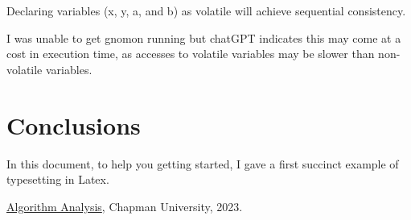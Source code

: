 \documentclass{article}
\theoremstyle{theorem}
\theoremstyle{definition}
\theoremstyle{remark}
\begin{document}
\begin{itemize}
    Declaring variables (x, y, a, and b) as volatile will achieve sequential consistency. 

    I was unable to get gnomon running but chatGPT indicates this may come at a cost in execution time, as accesses to volatile variables may be slower than non-volatile variables.



\end{itemize}

\section{Conclusions}\label{conclusions}

In this document, to help you getting started, I gave a first succinct example of typesetting in Latex.

\begin{thebibliography}{99}
 \href{https://github.com/alexhkurz/algorithm-analysis-2023}{Algorithm Analysis}, Chapman University, 2023.
\end{thebibliography}
\end{document}
